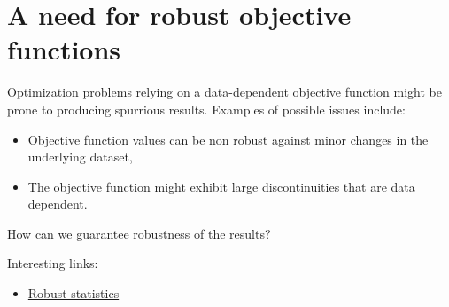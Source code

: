 \documentclass[]{article}
\begin{document}
\section{A need for robust objective functions}

Optimization problems relying on a data-dependent objective function might be prone to producing spurrious results. Examples of possible issues include:
\begin{itemize}
\item Objective function values can be non robust against minor changes in the underlying dataset,
\item The objective function might exhibit large discontinuities that are data dependent.
\end{itemize}


\noindent How can we guarantee robustness of the results?
\newline

\noindent Interesting links:
\begin{itemize}
	\item \href{https://en.wikipedia.org/wiki/Robust_statistics}{Robust statistics}
\end{itemize}
\end{document}

